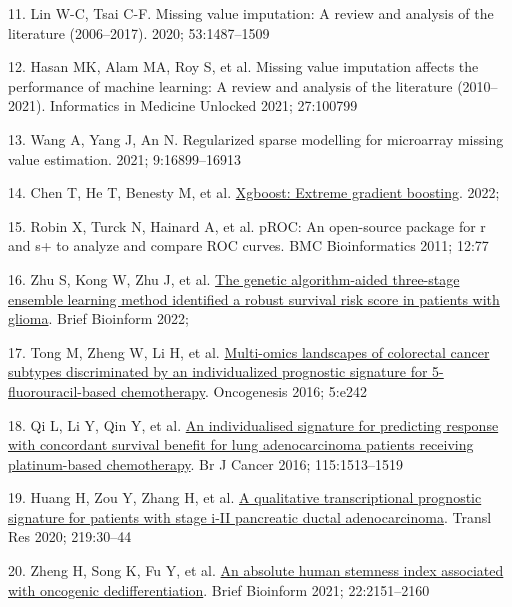 \documentclass[
  12pt,
]{book}
\newlength{\cslhangindent}
\newlength{\cslentryspacingunit} %
\newenvironment{CSLReferences}[2] %
 {%
  \setlength{\parindent}{0pt}
  \ifodd #1
  \let\oldpar\par
  \def\par{\hangindent=\cslhangindent\oldpar}
  \fi
  \setlength{\parskip}{#2\cslentryspacingunit}
 }%
 {}
\begin{document}
\begin{CSLReferences}{0}{0}
\leavevmode{}%
11. Lin W-C, Tsai C-F. Missing value imputation: A review and analysis of the literature (2006--2017). 2020; 53:1487--1509

\leavevmode{}%
12. Hasan MK, Alam MA, Roy S, et al. Missing value imputation affects the performance of machine learning: A review and analysis of the literature (2010--2021). Informatics in Medicine Unlocked 2021; 27:100799

\leavevmode{}%
13. Wang A, Yang J, An N. Regularized sparse modelling for microarray missing value estimation. 2021; 9:16899--16913

\leavevmode{}%
14. Chen T, He T, Benesty M, et al. \href{https://CRAN.R-project.org/package=xgboost}{Xgboost: Extreme gradient boosting}. 2022;

\leavevmode{}%
15. Robin X, Turck N, Hainard A, et al. pROC: An open-source package for r and s+ to analyze and compare ROC curves. BMC Bioinformatics 2011; 12:77

\leavevmode{}%
16. Zhu S, Kong W, Zhu J, et al. \href{https://doi.org/10.1093/bib/bbac344}{The genetic algorithm-aided three-stage ensemble learning method identified a robust survival risk score in patients with glioma}. Brief Bioinform 2022;

\leavevmode{}%
17. Tong M, Zheng W, Li H, et al. \href{https://doi.org/10.1038/oncsis.2016.51}{Multi-omics landscapes of colorectal cancer subtypes discriminated by an individualized prognostic signature for 5-fluorouracil-based chemotherapy}. Oncogenesis 2016; 5:e242

\leavevmode{}%
18. Qi L, Li Y, Qin Y, et al. \href{https://doi.org/10.1038/bjc.2016.370}{An individualised signature for predicting response with concordant survival benefit for lung adenocarcinoma patients receiving platinum-based chemotherapy}. Br J Cancer 2016; 115:1513--1519

\leavevmode{}%
19. Huang H, Zou Y, Zhang H, et al. \href{https://doi.org/10.1016/j.trsl.2020.02.004}{A qualitative transcriptional prognostic signature for patients with stage i-II pancreatic ductal adenocarcinoma}. Transl Res 2020; 219:30--44

\leavevmode{}%
20. Zheng H, Song K, Fu Y, et al. \href{https://doi.org/10.1093/bib/bbz174}{An absolute human stemness index associated with oncogenic dedifferentiation}. Brief Bioinform 2021; 22:2151--2160


\end{CSLReferences}
\end{document}
